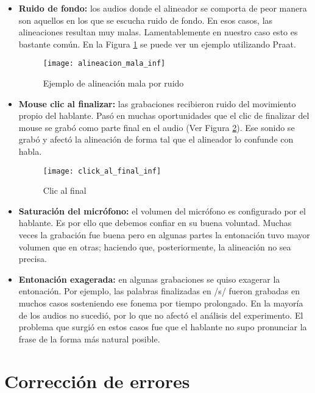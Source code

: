 \begin{itemize}
    \item \textbf{Ruido de fondo:} los audios donde el alineador se comporta de peor manera son aquellos en los que se escucha ruido de fondo. En esos casos, las alineaciones resultan muy malas. Lamentablemente en nuestro caso esto es bastante común. En la Figura \ref{alinMala} se puede ver un ejemplo utilizando Praat.

\begin{figure}[h!]
    \centerline{\texttt{[image: alineacion\_mala\_inf]} }
    \caption{Ejemplo de alineación mala por ruido}
    \label{alinMala}
\end{figure}

    \item \textbf{Mouse clic al finalizar:} las grabaciones recibieron ruido del movimiento propio del hablante. Pasó en muchas oportunidades que el clic de finalizar del mouse se grabó como parte final en el audio (Ver Figura \ref{clickFinal}). Ese sonido se grabó y afectó la alineación de forma tal que el alineador lo confunde con habla.
    
\begin{figure}[h!]
    \centerline{\texttt{[image: click\_al\_final\_inf]} }
    \caption{Clic al final}
    \label{clickFinal}
\end{figure}

    \item \textbf{Saturación del micrófono:} el volumen del micrófono es configurado por el hablante. Es por ello que debemos confiar en su buena voluntad. Muchas veces la grabación fue buena pero en algunas partes la entonación tuvo mayor volumen que en otras; haciendo que, posteriormente, la alineación no sea precisa.
    
    \item \textbf{Entonación exagerada:} en algunas grabaciones se quiso exagerar la entonación. Por ejemplo, las palabras finalizadas en /s/ fueron grabadas en muchos casos sosteniendo ese fonema por tiempo prolongado. En la mayoría de los audios no sucedió, por lo que no afectó el análisis del experimento. El problema que surgió en estos casos fue que el hablante no supo pronunciar la frase de la forma más natural posible. 
    
\end{itemize}

\section{Corrección de errores}

